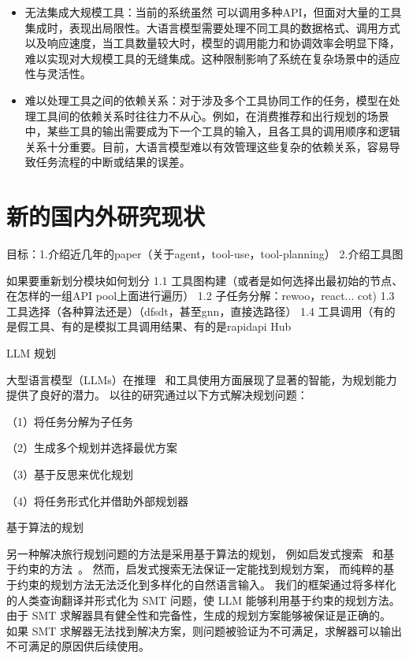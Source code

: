 \begin{itemize}
    \item 无法集成大规模工具：当前的系统虽然 可以调用多种API，但面对大量的工具集成时，表现出局限性。大语言模型需要处理不同工具的数据格式、调用方式以及响应速度，当工具数量较大时，模型的调用能力和协调效率会明显下降，难以实现对大规模工具的无缝集成。这种限制影响了系统在复杂场景中的适应性与灵活性。
    \item 难以处理工具之间的依赖关系：对于涉及多个工具协同工作的任务，模型在处理工具间的依赖关系时往往力不从心。例如，在消费推荐和出行规划的场景中，某些工具的输出需要成为下一个工具的输入，且各工具的调用顺序和逻辑关系十分重要。目前，大语言模型难以有效管理这些复杂的依赖关系，容易导致任务流程的中断或结果的误差。
\end{itemize}

\section{新的国内外研究现状}

目标：1.介绍近几年的paper（关于agent，tool-use，tool-planning） 2.介绍工具图

如果要重新划分模块如何划分
1.1 工具图构建（或者是如何选择出最初始的节点、在怎样的一组API pool上面进行遍历）
1.2 子任务分解：rewoo，react... cot) 
1.3 工具选择（各种算法还是）（dfsdt，甚至gnn，直接选路径） 
1.4 工具调用（有的是假工具、有的是模拟工具调用结果、有的是rapidapi Hub





LLM 规划

大型语言模型（LLMs）在推理~\cite{wei2022chain, kojima2022large, Yao2023b} 和工具使用\cite{Qin2023, schick2024toolformer}方面展现了显著的智能，为规划能力提供了良好的潜力。
以往的研究通过以下方式解决规划问题\cite{huang2024understanding}：

（1）将任务分解为子任务\cite{Wang2023a, Yao2023b, Shen2023}

（2）生成多个规划并选择最优方案\cite{wang2022self, Yao2023a, Besta2023, hao2023reasoning}

（3）基于反思来优化规划\cite{shinn2024reflexion, madaan2024self, chen2024scalable}

（4）将任务形式化并借助外部规划器\cite{liu2023llm+, guan2023leveraging, chen2024autotamp}

基于算法的规划

另一种解决旅行规划问题的方法是采用基于算法的规划，
例如启发式搜索~\cite{hoffmann2001ff, helmert2006fast, vidal2014yahsp3} 
和基于约束的方法~\cite{kautz1999unifying, rintanen2012planning, rintanen2014madagascar, lozano2014constraint, dantam2016incremental}。
然而，启发式搜索无法保证一定能找到规划方案，
而纯粹的基于约束的规划方法无法泛化到多样化的自然语言输入。
我们的框架通过将多样化的人类查询翻译并形式化为 SMT 问题，使 LLM 能够利用基于约束的规划方法。
由于 SMT 求解器具有健全性和完备性，生成的规划方案能够被保证是正确的。
如果 SMT 求解器无法找到解决方案，则问题被验证为不可满足，求解器可以输出不可满足的原因供后续使用。

